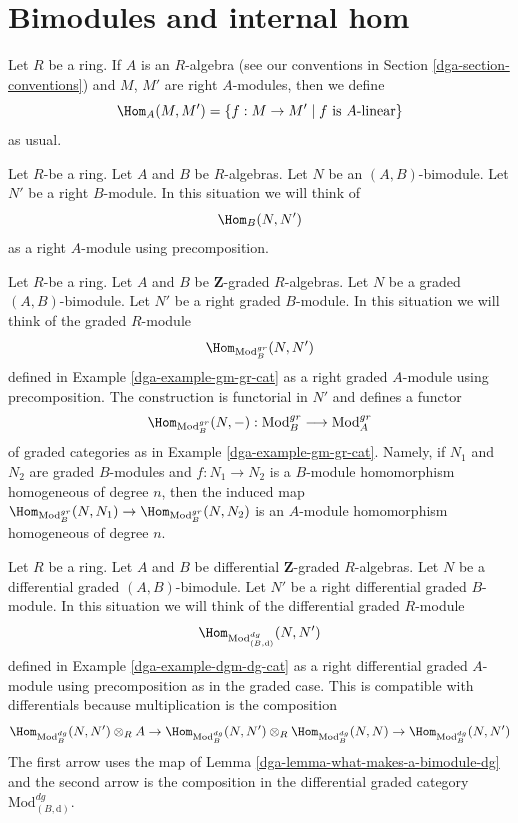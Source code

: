 \section{Bimodules and internal hom}
\label{dga-section-bimodules-hom}
Let $R$ be a ring. If $A$ is an $R$-algebra (see our conventions
in Section \ref{dga-section-conventions}) and $M$, $M'$ are right
$A$-modules, then we define
$$
\Hom_A(M, M') = \{f : M \to M' \mid f \text{ is }A\text{-linear}\}
$$
as usual.

\medskip\noindent
Let $R$-be a ring. Let $A$ and $B$ be $R$-algebras. Let
$N$ be an $(A, B)$-bimodule. Let $N'$ be a right $B$-module.
In this situation we will think of
$$
\Hom_B(N, N')
$$
as a right $A$-module using precomposition.

\medskip\noindent
Let $R$-be a ring. Let $A$ and $B$ be $\mathbf{Z}$-graded $R$-algebras. Let
$N$ be a graded $(A, B)$-bimodule. Let $N'$ be a right graded $B$-module.
In this situation we will think of the graded $R$-module
$$
\Hom_{\text{Mod}^{gr}_B}(N, N')
$$
defined in Example \ref{dga-example-gm-gr-cat} as a right graded $A$-module
using precomposition. The construction is functorial in $N'$ and defines
a functor
$$
\Hom_{\text{Mod}^{gr}_B}(N, -) :
\text{Mod}^{gr}_B
\longrightarrow
\text{Mod}^{gr}_A
$$
of graded categories as in Example \ref{dga-example-gm-gr-cat}. Namely, if
$N_1$ and $N_2$ are graded $B$-modules and $f : N_1 \to N_2$ is a $B$-module
homomorphism homogeneous of degree $n$, then the induced map
$\Hom_{\text{Mod}^{gr}_B}(N, N_1) \to \Hom_{\text{Mod}^{gr}_B}(N, N_2)$
is an $A$-module homomorphism homogeneous of degree $n$.

\medskip\noindent
Let $R$ be a ring. Let $A$ and $B$ be differential $\mathbf{Z}$-graded
$R$-algebras. Let $N$ be a differential graded $(A, B)$-bimodule.
Let $N'$ be a right differential graded $B$-module. In this situation
we will think of the differential graded $R$-module
$$
\Hom_{\text{Mod}^{dg}_{(B, \text{d})}}(N, N')
$$
defined in Example \ref{dga-example-dgm-dg-cat} as a right differential
graded $A$-module using precomposition as in the graded case. This
is compatible with differentials because multiplication is the
composition
$$
\Hom_{\text{Mod}^{dg}_B}(N, N') \otimes_R A \to
\Hom_{\text{Mod}^{dg}_B}(N, N') \otimes_R
\Hom_{\text{Mod}^{dg}_B}(N, N) \to
\Hom_{\text{Mod}^{dg}_B}(N, N')
$$
The first arrow uses the map
of Lemma \ref{dga-lemma-what-makes-a-bimodule-dg} and the second
arrow is the composition in the differential graded category
$\text{Mod}^{dg}_{(B, \text{d})}$.

